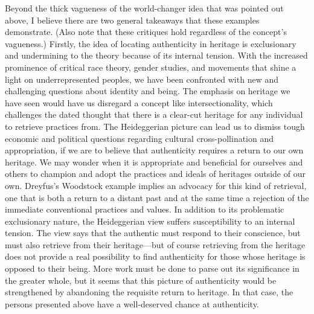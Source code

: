 Beyond the thick vagueness of the world-changer idea that was pointed
out above, I believe there are two general takeaways that these examples
demonstrate. (Also note that these critiques hold regardless of the
concept's vagueness.) Firstly, the idea of locating authenticity in
heritage is exclusionary and undermining to the theory because of its
internal tension. With the increased prominence of critical race theory,
gender studies, and movements that shine a light on underrepresented
peoples, we have been confronted with new and challenging questions
about identity and being. The emphasis on heritage we have seen would
have us disregard a concept like intersectionality, which challenges the
dated thought that there is a clear-cut heritage for any individual to
retrieve practices from. The Heideggerian picture can lead us to dismiss
tough economic and political questions regarding cultural
cross-pollination and appropriation, if we are to believe that
authenticity requires a return to our own heritage. We may wonder when
it is appropriate and beneficial for ourselves and others to champion
and adopt the practices and ideals of heritages outside of our own.
Dreyfus's Woodstock example implies an advocacy for this kind of
retrieval, one that is both a return to a distant past and at the same
time a rejection of the immediate conventional practices and values. In
addition to its problematic exclusionary nature, the Heideggerian view
suffers susceptibility to an internal tension. The view says that the
authentic must respond to their conscience, but must also retrieve from
their heritage---but of course retrieving from the heritage does not
provide a real possibility to find authenticity for those whose heritage
is opposed to their being. More work must be done to parse out its
significance in the greater whole, but it seems that this picture of
authenticity would be strengthened by abandoning the requisite return to
heritage. In that case, the persons presented above have a well-deserved
chance at authenticity.

